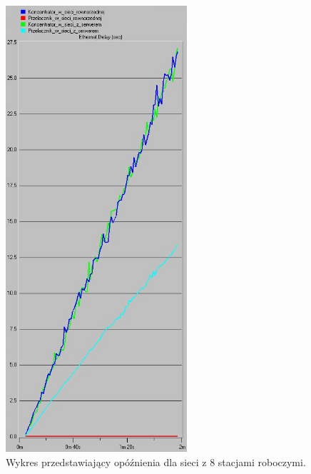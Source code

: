 \documentclass{article}
\begin{document}
\begin{figure}[H]
  \centering
  \includegraphics[width=0.60\textwidth]{screens/8_delay.png}
 \caption{Wykres przedstawiający opóźnienia dla sieci z 8 stacjami roboczymi.}
 \label{fig:8stacjed}
\end{figure}
\end{document}
